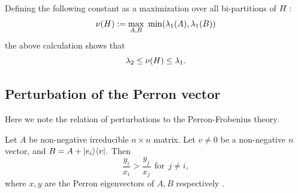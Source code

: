 \documentclass[12pt]{article}
\begin{document}
Defining the following constant as a maximization over
all bi-partitions of $H:$
$$
    \nu(\Ham) := \max_{A, B}\ \mbox{min}(\lambda_1(A), \lambda_1(B))
$$
the above calculation shows that
$$
    \lambda_2 \le \nu(H) \le \lambda_1.
$$



%

%
%
%



\subsection{Perturbation of the Perron vector}

Here we note the relation of
perturbations to the Perron-Frobenius theory.

Let $A$ be non-negative irreducible $n\times n$ matrix.
Let $v\ne 0$ be a non-negative $n$ vector, and $B = A + |{e_i}\rangle\langle{v}|.$
Then 
$$
\frac{y_i}{x_i} > \frac{y_j}{x_j} \ \ \mbox{for}\ \ j \ne i,
$$
where $x, y$ are the Perron eigenvectors of $A, B$ respectively
\cite{Elsner1982}.
\end{document}
